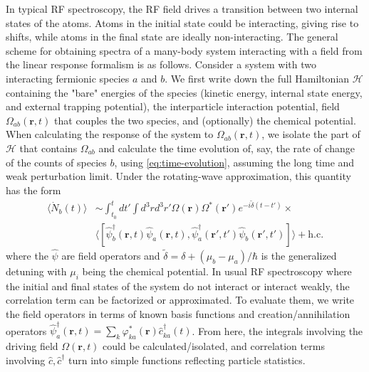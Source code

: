 \documentclass[prl,
twocolumn,
nofootinbib,
amsmath,amssymb,
aps]{revtex4-1}
\begin{document}
In typical RF spectroscopy, the RF field drives a transition between two internal states of the atoms. Atoms in the initial state could be interacting, giving rise to shifts, while atoms in the final state are ideally non-interacting.  The general scheme for obtaining spectra of a many-body system interacting with a field from the linear response formalism is as follows. Consider a system with two interacting fermionic species $a$ and $b$. We first write down the full Hamiltonian $\mathcal{H}$ containing the "bare" energies of the species (kinetic energy, internal state energy, and external trapping potential), the interparticle interaction potential, field $\Omega_{ab}(\mathbf{r},t)$ that couples the two species, and (optionally) the chemical potential. When calculating the response of the system to $\Omega_{ab}(\mathbf{r},t)$, we isolate the part of $\mathcal{H}$ that contains $\Omega_{ab}$ and calculate the time evolution of, say, the rate of change of the counts of species $b$, using \eqref{eq:time-evolution}, assuming the long time and weak perturbation limit. Under the rotating-wave approximation, this quantity has the form
\begin{align*}
\langle \dot N_b(t) \rangle &\sim \int_{t_0}^t dt' \int d^3 r  d^3 r' \Omega(\mathbf{r}) \Omega^*(\mathbf{r}') e^{-i \widetilde{\delta}(t-t')}  \times \\
& \langle [\hat{\psi}_b^\dagger (\mathbf{r},t) \hat{\psi}_a (\mathbf{r},t), \hat{\psi}_a^\dagger (\mathbf{r}',t') \hat{\psi}_b (\mathbf{r}',t') ] \rangle+ \text{h.c.}
\end{align*} 
where the $\hat{\psi}$ are field operators and $\widetilde{\delta} = \delta + (\mu_b - \mu_a)/\hbar$ is the generalized detuning with $\mu_i$ being the chemical potential. In usual RF spectroscopy where the initial and final states of the system do not interact or interact weakly, the correlation term can be factorized or approximated. To evaluate them, we write the field operators in terms of known basis functions and creation/annihilation operators $\hat{\psi}_a^\dagger(\mathbf{r},t) = \sum_k \varphi^*_{ka}(\mathbf{r}) \hat{c}_{ka}^\dagger(t)$. From here, the integrals involving the driving field $\Omega(\mathbf{r},t)$ could be calculated/isolated, and correlation terms involving $\hat{c},\hat{c}^\dagger$ turn into simple functions reflecting particle statistics.  
\end{document}

